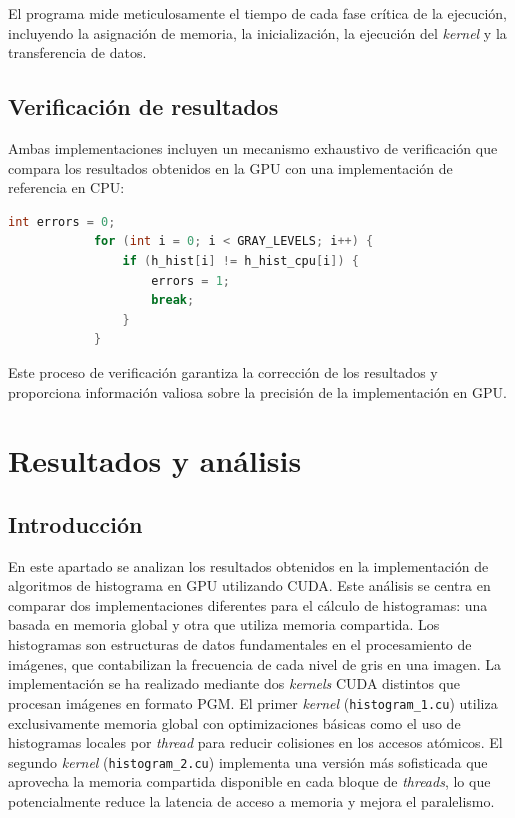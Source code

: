         El programa mide meticulosamente el tiempo de cada fase crítica de la ejecución, incluyendo la asignación de memoria, la inicialización, la ejecución del \textit{kernel} y la transferencia de datos.
        
    \subsection{Verificación de resultados}
        
        Ambas implementaciones incluyen un mecanismo exhaustivo de verificación que compara los resultados obtenidos en la GPU con una implementación de referencia en CPU:
        
        \begin{lstlisting}[language=C, caption={Comprobación de errores.}, gobble=12]
            int errors = 0;
            for (int i = 0; i < GRAY_LEVELS; i++) {
                if (h_hist[i] != h_hist_cpu[i]) {
                    errors = 1;
                    break;
                }
            }
        \end{lstlisting}
        
        Este proceso de verificación garantiza la corrección de los resultados y proporciona información valiosa sobre la precisión de la implementación en GPU.

\newpage

\section{Resultados y análisis}
    
    \subsection{Introducción}

        En este apartado se analizan los resultados obtenidos en la implementación de algoritmos de histograma en GPU utilizando CUDA. Este análisis se centra en comparar dos implementaciones diferentes para el cálculo de histogramas: una basada en memoria global y otra que utiliza memoria compartida. Los histogramas son estructuras de datos fundamentales en el procesamiento de imágenes, que contabilizan la frecuencia de cada nivel de gris en una imagen.
        La implementación se ha realizado mediante dos \textit{kernels} CUDA distintos que procesan imágenes en formato PGM. El primer \textit{kernel} (\texttt{histogram\_1.cu}) utiliza exclusivamente memoria global con optimizaciones básicas como el uso de histogramas locales por \textit{thread} para reducir colisiones en los accesos atómicos. El segundo \textit{kernel} (\texttt{histogram\_2.cu}) implementa una versión más sofisticada que aprovecha la memoria compartida disponible en cada bloque de \textit{threads}, lo que potencialmente reduce la latencia de acceso a memoria y mejora el paralelismo.

